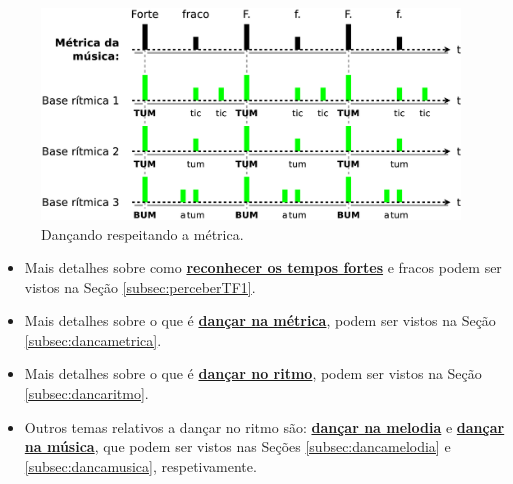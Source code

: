 \begin{figure}[!h]
    \centering 
    \includegraphics[width=0.99\textwidth]{chapters/cap-musicalidade/fora-do-ritmo-com.eps}
    \caption{Dançando respeitando a métrica.}
    \label{fig:fora-do-ritmo-com}
\end{figure}

\begin{tcbattention}
\begin{itemize}
\item Mais detalhes sobre como \hyperref[subsec:perceberTF1]{\textbf{reconhecer os tempos fortes}} 
e fracos podem ser vistos na Seção \ref{subsec:perceberTF1}.
\item Mais detalhes sobre o que é \hyperref[subsec:dancametrica]{\textbf{dançar na métrica}}, 
podem ser vistos na Seção \ref{subsec:dancametrica}.
\item Mais detalhes sobre o que é \hyperref[subsec:dancaritmo]{\textbf{dançar no ritmo}}, 
podem ser vistos na Seção \ref{subsec:dancaritmo}.
\item Outros temas relativos a dançar no ritmo são: 
\hyperref[subsec:dancamelodia]{\textbf{dançar na melodia}} e
\hyperref[subsec:dancamusica]{\textbf{dançar na música}},
que podem ser vistos nas Seções \ref{subsec:dancamelodia} e \ref{subsec:dancamusica},
respetivamente.
\end{itemize}
\end{tcbattention}

